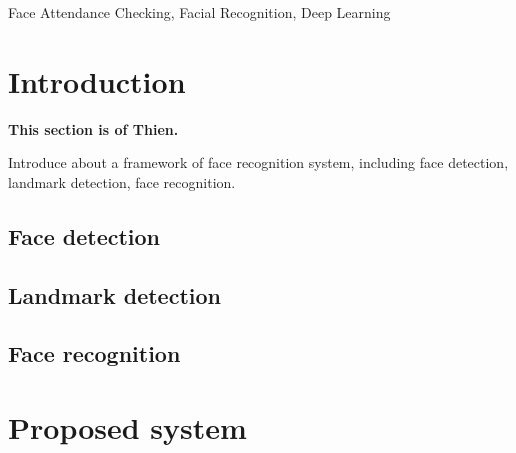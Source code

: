 \documentclass[journal, twocolumn]{IEEEtran}
\begin{document}
\begin{IEEEkeywords}
Face Attendance Checking, Facial Recognition, Deep Learning
\end{IEEEkeywords}


\IEEEpeerreviewmaketitle


\section{Introduction}
\label{introduction}
\textbf{This section is of Thien.}

Introduce about a framework of face recognition system, including face detection, landmark detection, face recognition.

\subsection{Face detection}

\subsection{Landmark detection}

\subsection{Face recognition}


\medskip
\section{Proposed system}
\label{proposed-system}
\end{document}
